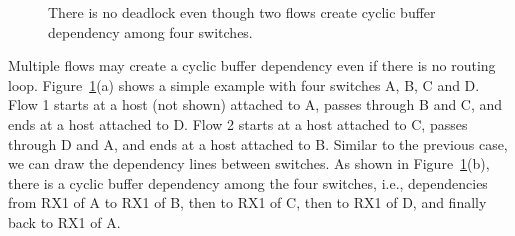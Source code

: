 \begin{figure}[t]
	\vspace{-0.15in}
	\caption{There is no deadlock even though two flows create cyclic buffer dependency among four switches.}
	\label{fig:case1}
	\vspace{-0.2in}
\end{figure}


Multiple flows may create a cyclic buffer dependency even if there is no routing loop.
Figure~\ref{fig:case1}(a) shows a simple example with four switches A, B, C and D.
Flow 1 starts at a host (not shown) attached to A, passes through B and C, and ends at a
host attached to D. Flow 2 starts at a host attached to C, passes through D and A, and
ends at a host attached to B.
Similar to the previous case, we can draw the dependency lines between switches. As shown in
Figure~\ref{fig:case1}(b), there is a cyclic buffer dependency among the four switches, i.e.,
dependencies from RX1 of A to RX1 of B, then to RX1 of C, then to RX1 of D, and finally back to RX1 of A.


